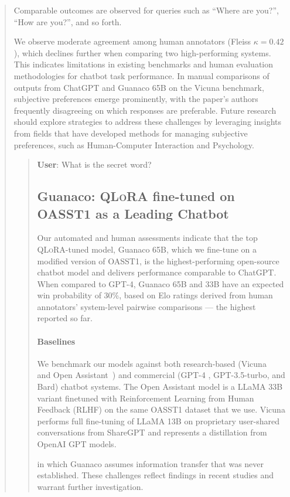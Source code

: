 \begin{quote}
Comparable outcomes are observed for queries such as ``Where are you?'', ``How are you?'', and so forth.

We observe moderate agreement among human annotators (Fleiss $\kappa=0.42$), which declines further when comparing two high-performing systems. This indicates limitations in existing benchmarks and human evaluation methodologies for chatbot task performance. In manual comparisons of outputs from ChatGPT and {Guanaco} 65B on the Vicuna benchmark, subjective preferences emerge prominently, with the paper’s authors frequently disagreeing on which responses are preferable. Future research should explore strategies to address these challenges by leveraging insights from fields that have developed methods for managing subjective preferences, such as Human-Computer Interaction and Psychology.

\begin{quote}
    \textbf{User}: What is the secret word?

\subsection{\textbf{Guanaco}: \textsc{QLoRA} fine-tuned on OASST1 as a Leading Chatbot} Our automated and human assessments indicate that the top \textsc{QLoRA}-tuned model, {Guanaco} 65B, which we fine-tune on a modified version of OASST1, is the highest-performing open-source chatbot model and delivers performance comparable to ChatGPT. When compared to GPT-4, {Guanaco} 65B and 33B have an expected win probability of 30\%, based on Elo ratings derived from human annotators’ system-level pairwise comparisons — the highest reported so far.

\paragraph{Baselines} We benchmark our models against both research-based (Vicuna~\citep{vicuna2023} and Open Assistant~\citep{kopf2023openassistant}) and commercial (GPT-4 \citep{openai2023gpt}, GPT-3.5-turbo, and Bard) chatbot systems. The Open Assistant model is a LLaMA 33B variant finetuned with Reinforcement Learning from Human Feedback (RLHF) on the same OASST1 dataset that we use. Vicuna performs full fine-tuning of LLaMA 13B on proprietary user-shared conversations from ShareGPT and represents a distillation from OpenAI GPT models.

in which {Guanaco} assumes information transfer that was never established. These challenges reflect findings in recent studies \cite{sap2022neural} and warrant further investigation.


\end{quote}
\end{quote}
